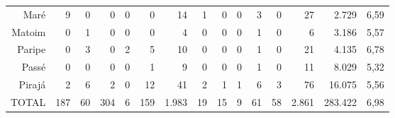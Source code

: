 \begin{sidewaystable}[!htp]
{\begin{tiny}
\begin{tabular}{rrrrrrrrrrrrrrr}
Maré	&9	&0	&0	&0	&0	&14	&1	&0	&0	&3	&0	&27	&2.729	&6,59 \\
Matoim	&0	&1	&0	&0	&0	&4	&0	&0	&0	&1	&0	&6	&3.186	&5,57 \\
Paripe	&0	&3	&0	&2	&5	&10	&0	&0	&0	&1	&0	&21	&4.135	&6,78 \\
Passé	&0	&0	&0	&0	&1	&9	&0	&0	&0	&1	&0	&11	&8.029	&5,32 \\
Pirajá	&2	&6	&2	&0	&12	&41	&2	&1	&1	&6	&3	&76	&16.075	&5,56 \\
\hline
TOTAL	&187	&60	&304	&6	&159	&1.983	&19	&15	&9	&61	&58	&2.861	&283.422	&6,98 \\
\hline
\end{tabular} 
\end{tiny}
}
{}
\end{sidewaystable}